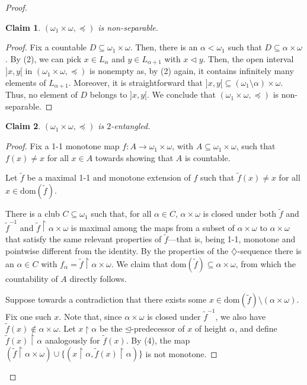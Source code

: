 \documentclass[12pt]{amsart}
\newtheorem{claim}{Claim}[theorem]
\theoremstyle{definition}
\theoremstyle{remark}
\begin{document}
\begin{proof}
\begin{claim}
$(\omega_1 \times \omega, \preceq)$ is non-separable.
\end{claim}
\begin{proof}
Fix a countable $D\subseteq \omega_1 \times \omega$. Then, there is an $\alpha < \omega_1$ such that $D\subseteq \alpha \times \omega$. By (2), we can pick $x \in L_\alpha$  and $y \in L_{\alpha+1}$  with $x \lhd y$. Then, the open interval $]x, y[$ in $(\omega_1 \times \omega, \preceq)$ is nonempty as, by (2) again, it contains infinitely many elements of $L_{\alpha+1}$. Moreover, it is straightforward that ${]x,y[} \subseteq (\omega_1\setminus \alpha) \times \omega$. Thus, no element of $D$ belongs to $]x,y[$. We conclude that $(\omega_1 \times \omega, \preceq)$ is non-separable.
\end{proof}


\begin{claim}
$(\omega_1 \times \omega, \preceq)$ is $2$-entangled.
\end{claim}
\begin{proof}
Fix a 1-1 monotone map $f: A \rightarrow \omega_1 \times \omega$, with $A \subseteq \omega_1 \times \omega$, such that $f(x) \neq x$ for all $x \in A$ towards showing that $A$ is countable.

Let $\tilde{f}$ be a maximal 1-1 and monotone extension of $f$ such that $\tilde{f}(x) \neq x$ for all $x \in \mathrm{dom}(\tilde{f})$.


There is a club $C\subseteq\omega_1$ such that, for all $\alpha \in C$, $\alpha \times \omega$ is closed under both $\tilde{f}$ and $\tilde{f}^{-1}$ and  $\tilde{f}  \upharpoonright \alpha \times \omega$ is maximal among the maps from a subset of $\alpha \times \omega$ to $\alpha\times \omega$ that satisfy the same relevant properties of $\tilde{f}$---that is, being 1-1, monotone and pointwise different from the identity. By the properties of the $\diamondsuit$-sequence there is an $\alpha \in C$ with $f_\alpha = \tilde{f} \upharpoonright \alpha \times \omega$. We claim that $\mathrm{dom}(\tilde{f}) \subseteq \alpha \times \omega$, from which the countability of $A$ directly follows.

Suppose towards a contradiction that there exists some $x \in \mathrm{dom}(\tilde{f}) \setminus (\alpha \times \omega)$. Fix one such $x$. Note that, since $\alpha \times \omega$ is closed under $\tilde{f}^{-1}$, we also have $\tilde{f}(x) \not\in \alpha \times \omega$.  Let $x \upharpoonright \alpha$ be the $\unlhd$-predecessor of $x$ of height $\alpha$, and define $\tilde{f}(x) \upharpoonright \alpha$ analogously for $\tilde{f}(x)$.  By (4), the map $(\tilde{f} \upharpoonright \alpha \times \omega) \cup \{(x \upharpoonright \alpha, \tilde{f}(x) \upharpoonright \alpha)\}$ is not monotone.


\end{proof}
\end{proof}
\end{document}
